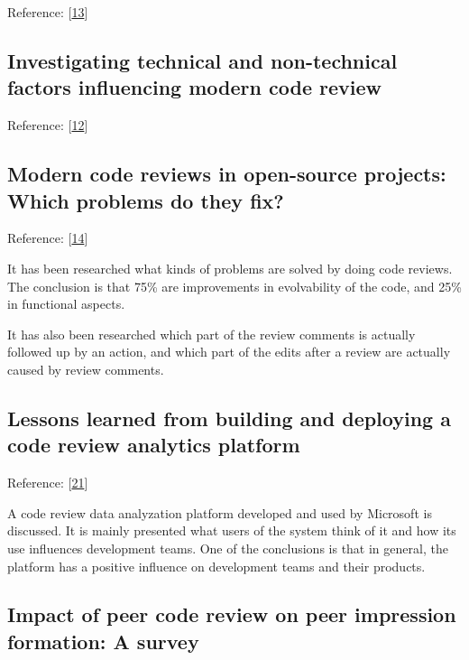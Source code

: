 \documentclass[]{book}
\begin{document}
Reference: {[}\protect\hyperlink{ref-baysal2013influence}{13}{]}

\subsection{Investigating technical and non-technical factors
influencing modern code
review}\label{investigating-technical-and-non-technical-factors-influencing-modern-code-review}

Reference: {[}\protect\hyperlink{ref-baysal2016investigating}{12}{]}

\subsection{Modern code reviews in open-source projects: Which problems
do they
fix?}\label{modern-code-reviews-in-open-source-projects-which-problems-do-they-fix}

Reference: {[}\protect\hyperlink{ref-beller2014modern}{14}{]}

It has been researched what kinds of problems are solved by doing code
reviews. The conclusion is that 75\% are improvements in evolvability of
the code, and 25\% in functional aspects.

It has also been researched which part of the review comments is
actually followed up by an action, and which part of the edits after a
review are actually caused by review comments.

\subsection{Lessons learned from building and deploying a code review
analytics
platform}\label{lessons-learned-from-building-and-deploying-a-code-review-analytics-platform}

Reference: {[}\protect\hyperlink{ref-bird2015lessons}{21}{]}

A code review data analyzation platform developed and used by Microsoft
is discussed. It is mainly presented what users of the system think of
it and how its use influences development teams. One of the conclusions
is that in general, the platform has a positive influence on development
teams and their products.

\subsection{Impact of peer code review on peer impression formation: A
survey}\label{impact-of-peer-code-review-on-peer-impression-formation-a-survey}
\end{document}
